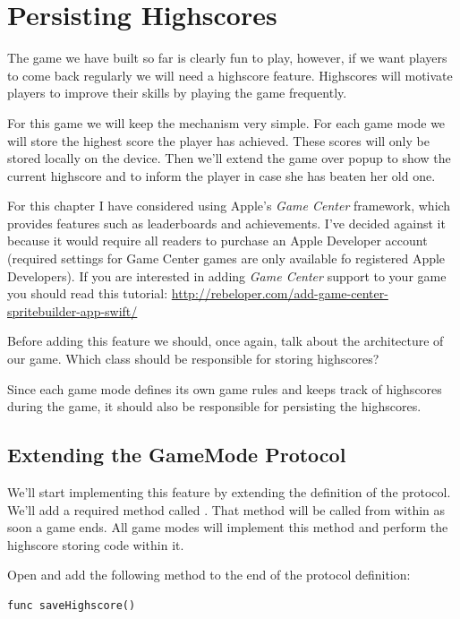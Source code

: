 \chapter{Persisting Highscores}
The game we have built so far is clearly fun to play, however, if we want
players to come back regularly we will need a highscore feature. Highscores will
motivate players to improve their skills by playing the game frequently.

For this game we will keep the mechanism very simple. For each game mode we will
store the highest score the player has achieved. These scores will only be
stored locally on the device. Then we'll extend the game over popup to show the
current highscore and to inform the player in case she has beaten her old one.

\begin{details}
For this chapter I have considered using Apple's \textit{Game Center} framework,
which provides features such as leaderboards and achievements. I've decided
against it because it would require all readers to purchase an Apple Developer
account (required settings for Game Center games are only available fo
registered Apple Developers). If you are interested in adding \textit{Game
Center} support to your game you should read this tutorial:
\url{http://rebeloper.com/add-game-center-spritebuilder-app-swift/}
\end{details}

Before adding this feature we should, once again, talk about the architecture of
our game. Which class should be responsible for storing highscores?

Since each game mode defines its own game rules and keeps track of highscores
during the game, it should also be responsible for persisting the highscores.
 
\section{Extending the GameMode Protocol}
We'll start implementing this feature by extending the definition of the
 protocol. We'll add a required method called
. That method will be called from within
 as soon a game ends. All game modes will implement this
method and perform the highscore storing code within it.

\begin{leftbar}
Open  and add the following method to the
end of the protocol definition:
\begin{lstlisting}
func saveHighscore()
\end{lstlisting}
\end{leftbar}

